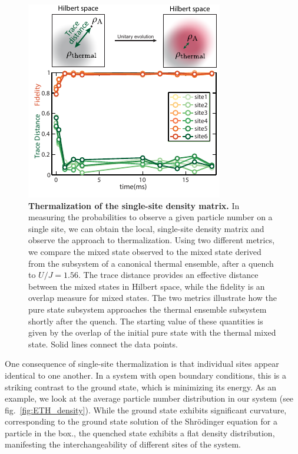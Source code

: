 \begin{figure}[t!]
	\centering
	\includegraphics[scale=1.5]{figures/ETH_fidelity.pdf}
	\caption{{\bf Thermalization of the single-site density matrix.} In measuring the probabilities to observe a given particle number on a single site, we can obtain the local, single-site density matrix and observe the approach to thermalization. Using two different metrics, we compare the mixed state observed to the mixed state derived from the subsystem of a canonical thermal ensemble, after a quench to $U/J=1.56$. The trace distance provides an effective distance between the mixed states in Hilbert space, while the fidelity is an overlap measure for mixed states. The two metrics illustrate how the pure state subsystem approaches the thermal ensemble subsystem shortly after the quench. The starting value of these quantities is given by the overlap of the initial pure state with the thermal mixed state. Solid lines connect the data points.}
	\label{fig:ETH_Rho}
\end{figure} 

One consequence of single-site thermalization is that individual sites appear identical to one another. In a system with open boundary conditions, this is a striking contrast to the ground state, which is minimizing its energy. As an example, we look at the average particle number distribution in our system (see fig.~\ref{fig:ETH_density}). While the ground state exhibits significant curvature, corresponding to the ground state solution of the Shr\"odinger equation for a particle in the box., the quenched state exhibits a flat density distribution, manifesting the interchangeability of different sites of the system.

